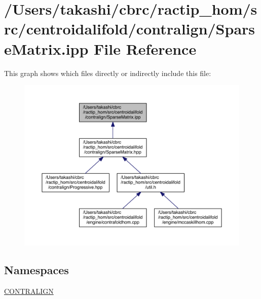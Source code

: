 \hypertarget{_sparse_matrix_8ipp}{\section{/\+Users/takashi/cbrc/ractip\+\_\+hom/src/centroidalifold/contralign/\+Sparse\+Matrix.ipp File Reference}
\label{_sparse_matrix_8ipp}
}
This graph shows which files directly or indirectly include this file\+:
\nopagebreak
\begin{figure}[H]
\begin{center}
\leavevmode
\includegraphics[width=350pt]{_sparse_matrix_8ipp__dep__incl}
\end{center}
\end{figure}
\subsection*{Namespaces}
\begin{DoxyCompactItemize}
\item 
 \hyperlink{namespace_c_o_n_t_r_a_l_i_g_n}{C\+O\+N\+T\+R\+A\+L\+I\+G\+N}
\end{DoxyCompactItemize}
